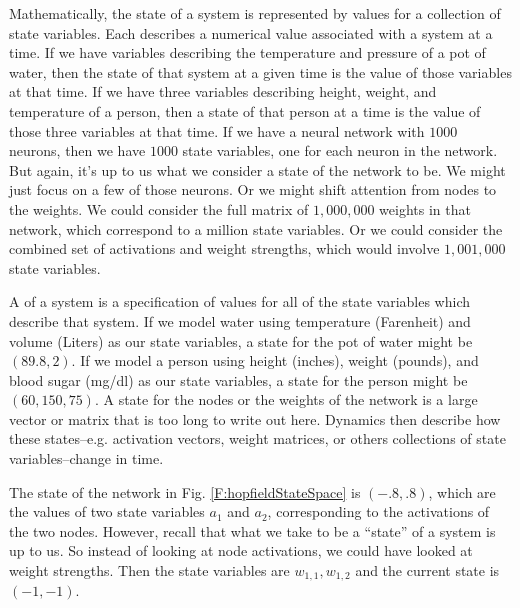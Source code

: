 Mathematically, the state of a system is represented by values for a collection of  state variables. Each  describes a numerical value associated with a system at a time. If we have variables describing the temperature and pressure of a pot of water, then the state of that system at a given time is the value of those variables at that time. If we have three variables describing height, weight, and temperature of a person, then a state of that person at a time is the value of those three variables at that time. If we have a neural network with $1000$ neurons, then we have $1000$ state variables, one for each neuron in the network. But again, it's up to us what we consider a state of the network to be. We might just focus on a few of those neurons. Or we might shift attention from nodes to the weights. We could consider the full matrix of $1,000,000$ weights in that network, which correspond to a million state variables. Or we could consider the combined set of activations and weight strengths, which would involve $1,001,000$ state variables.

A  of a system is a specification of values for all of the state variables which describe that system. If we model water using temperature (Farenheit) and volume (Liters) as our state variables,  a state for the pot of water might be $(89.8, 2)$. If we model a person using height (inches), weight (pounds), and blood sugar (mg/dl) as our state variables, a  state for the person might be $(60,150,75)$. A state for the nodes or the weights of the network is a large vector or matrix that is too long to write out here. Dynamics then describe how these states--e.g. activation vectors, weight matrices, or others collections of state variables--change in time.

The state of the network in Fig. \ref{F:hopfieldStateSpace} is $(-.8,.8)$, which are the values of two state variables $a_1$ and $a_2$, corresponding to the activations of the two nodes. However, recall that what we take to be a ``state'' of a system is up to us. So instead of looking at node activations, we could have looked at weight strengths. Then the state variables are $w_{1,1},w_{1,2}$ and the current state is  $(-1,-1)$. 

